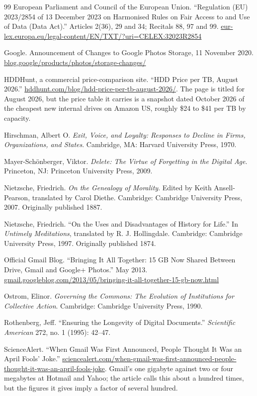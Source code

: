 \documentclass[12pt]{article}
\begin{document}
\begin{thebibliography}{99}
European Parliament and Council of the European Union. ``Regulation (EU) 2023/2854 of 13 December 2023 on Harmonised Rules on Fair Access to and Use of Data (Data Act).'' Articles 2(36), 29 and 34; Recitals 88, 97 and 99. \url{eur-lex.europa.eu/legal-content/EN/TXT/?uri=CELEX:32023R2854}

Google. Announcement of Changes to Google Photos Storage, 11 November 2020. \url{blog.google/products/photos/storage-changes/}

HDDHunt, a commercial price-comparison site. ``HDD Price per TB, August 2026.'' \url{hddhunt.com/blog/hdd-price-per-tb-august-2026/}. The page is titled for August 2026, but the price table it carries is a snapshot dated October 2026 of the cheapest new internal drives on Amazon US, roughly \$24 to \$41 per TB by capacity.

Hirschman, Albert O. \emph{Exit, Voice, and Loyalty: Responses to Decline in Firms, Organizations, and States}. Cambridge, MA: Harvard University Press, 1970.

Mayer-Sch\"onberger, Viktor. \emph{Delete: The Virtue of Forgetting in the Digital Age}. Princeton, NJ: Princeton University Press, 2009.

Nietzsche, Friedrich. \emph{On the Genealogy of Morality}. Edited by Keith Ansell-Pearson, translated by Carol Diethe. Cambridge: Cambridge University Press, 2007. Originally published 1887.

Nietzsche, Friedrich. ``On the Uses and Disadvantages of History for Life.'' In \emph{Untimely Meditations}, translated by R. J. Hollingdale. Cambridge: Cambridge University Press, 1997. Originally published 1874.

Official Gmail Blog. ``Bringing It All Together: 15 GB Now Shared Between Drive, Gmail and Google+ Photos.'' May 2013. \url{gmail.googleblog.com/2013/05/bringing-it-all-together-15-gb-now.html}

Ostrom, Elinor. \emph{Governing the Commons: The Evolution of Institutions for Collective Action}. Cambridge: Cambridge University Press, 1990.

Rothenberg, Jeff. ``Ensuring the Longevity of Digital Documents.'' \emph{Scientific American} 272, no. 1 (1995): 42--47.

ScienceAlert. ``When Gmail Was First Announced, People Thought It Was an April Fools' Joke.'' \url{sciencealert.com/when-gmail-was-first-announced-people-thought-it-was-an-april-fools-joke}. Gmail's one gigabyte against two or four megabytes at Hotmail and Yahoo; the article calls this about a hundred times, but the figures it gives imply a factor of several hundred.


\end{thebibliography}
\end{document}
